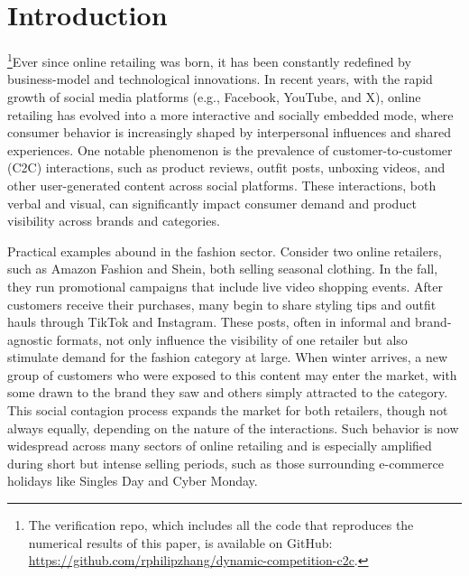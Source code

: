 \documentclass[nonblindrev,copyedit]{informs1}
\begin{document}
\maketitle

\section{Introduction}

\footnote{The verification repo, which includes all the code that reproduces the numerical results of this paper, is available on GitHub: \url{https://github.com/rphilipzhang/dynamic-competition-c2c}.}Ever since online retailing was born, it has been constantly redefined by business-model and technological innovations. In recent years, with the rapid growth of social media platforms (e.g., Facebook, YouTube, and X), online retailing has evolved into a more interactive and socially embedded mode, where consumer behavior is increasingly shaped by interpersonal influences and shared experiences. One notable phenomenon is the prevalence of customer-to-customer (C2C) interactions, such as product reviews, outfit posts, unboxing videos, and other user-generated content across social platforms. These interactions, both verbal and visual, can significantly impact consumer demand and product visibility across brands and categories.

Practical examples abound in the fashion sector. Consider two online retailers, such as Amazon Fashion and Shein, both selling seasonal clothing. In the fall, they run promotional campaigns that include live video shopping events. After customers receive their purchases, many begin to share styling tips and outfit hauls through TikTok and Instagram. These posts, often in informal and brand-agnostic formats, not only influence the visibility of one retailer but also stimulate demand for the fashion category at large. When winter arrives, a new group of customers who were exposed to this content may enter the market, with some drawn to the brand they saw and others simply attracted to the category. This social contagion process expands the market for both retailers, though not always equally, depending on the nature of the interactions. Such behavior is now widespread across many sectors of online retailing and is especially amplified during short but intense selling periods, such as those surrounding e-commerce holidays like Singles Day and Cyber Monday.
\end{document}
